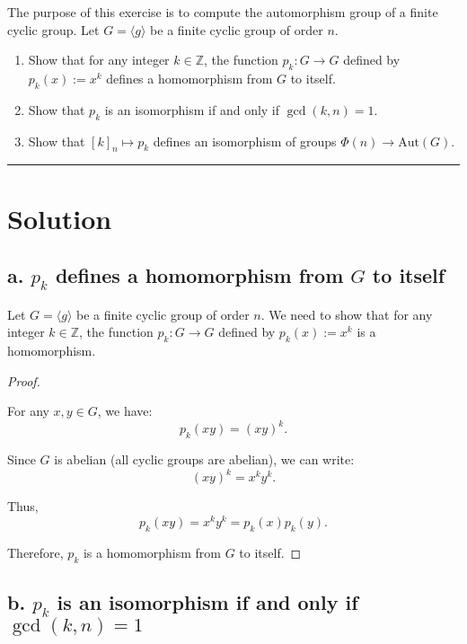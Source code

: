\documentclass[12pt]{amsart}
\theoremstyle{definition}
\numberwithin{equation}{section}
\newcommand{\Z}{\mathbb{Z}}
\begin{document}
\begin{exercise}{5} The purpose of this exercise is to compute the automorphism group of a finite cyclic group. Let \(G = \langle g \rangle\) be a finite cyclic group of order \(n\).
    \begin{enumerate}[label=\textbf{\alph*.}]
        \item Show that for any integer \(k \in \Z\), the function \(p_k: G \rightarrow G\) defined by \(p_k(x) := x^k\) defines a homomorphism from \(G\) to itself.
        \item Show that \(p_k\) is an isomorphism if and only if \(\gcd(k,n) = 1\).
        \item Show that \([k]_n \mapsto p_k\) defines an isomorphism of groups \(\Phi(n) \rightarrow \text{Aut}(G)\).
    \end{enumerate}
    
    \noindent\rule{\linewidth}{1pt}
    
    \section*{Solution}
    
    \subsection*{\textbf{a. \(p_k\) defines a homomorphism from \(G\) to itself}}
    
    Let \(G = \langle g \rangle\) be a finite cyclic group of order \(n\). We need to show that for any integer \(k \in \Z\), the function \(p_k: G \rightarrow G\) defined by \(p_k(x) := x^k\) is a homomorphism.
    
    \begin{proof} \( \)
    
    For any \(x, y \in G\), we have:
    \[
    p_k(xy) = (xy)^k.
    \]
    
    Since \(G\) is abelian (all cyclic groups are abelian), we can write:
    \[
    (xy)^k = x^k y^k.
    \]
    
    Thus,
    \[
    p_k(xy) = x^k y^k = p_k(x) p_k(y).
    \]
    
    Therefore, \(p_k\) is a homomorphism from \(G\) to itself.
    
    \end{proof}
    
    \subsection*{\textbf{b. \(p_k\) is an isomorphism if and only if \(\gcd(k, n) = 1\)}}
    

\end{exercise}
\end{document}
